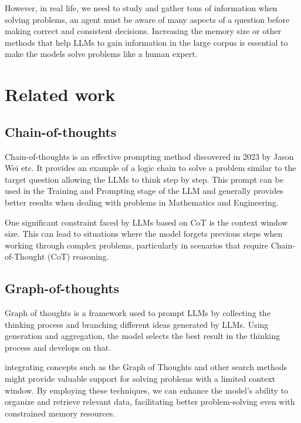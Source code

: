 \documentclass{article}
\begin{document}
However, in real life, we need to study and gather tons of information when solving problems, an agent must be aware of many aspects of a question before making correct and consistent decisions. Increasing the memory size or other methods that help LLMs to gain information in the large corpus is essential to make the models solve problems like a human expert.

\section{Related work}

\subsection{Chain-of-thoughts}

Chain-of-thoughts \cite{Wei2022ChainOT} is an effective prompting method discovered in 2023 by Jason Wei etc. It provides an example of a logic chain to solve a problem similar to the target question allowing the LLMs to think step by step. This prompt can be used in the Training and Prompting stage of the LLM and generally provides better results when dealing with problems in Mathematics and Engineering.

One significant constraint faced by LLMs based on CoT is the context window size. This can lead to situations where the model forgets previous steps when working through complex problems, particularly in scenarios that require Chain-of-Thought (CoT) reasoning.

\subsection{Graph-of-thoughts}

Graph of thoughts \cite{Besta_2024} is a framework used to prompt LLMs by collecting the thinking process and branching different ideas generated by LLMs. Using generation and aggregation, the model selects the best result in the thinking process and develops on that.  

integrating concepts such as the Graph of Thoughts and other search methods might provide valuable support for solving problems with a limited context window. By employing these techniques, we can enhance the model’s ability to organize and retrieve relevant data, facilitating better problem-solving even with constrained memory resources.
\end{document}
